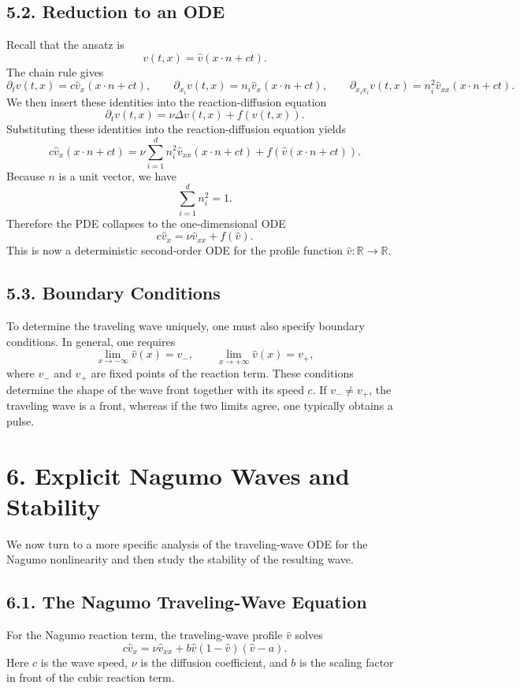 \documentclass[11pt]{article}
\theoremstyle{definition}
\theoremstyle{remark}
\begin{document}
\subsection*{5.2. Reduction to an ODE}
Recall that the ansatz is
\[
v(t,x)=\hat v(x\cdot n+ct).
\]
The chain rule gives
\[
\partial_t v(t,x)=c\hat v_x(x\cdot n+ct),
\qquad
\partial_{x_i}v(t,x)=n_i\hat v_x(x\cdot n+ct),
\qquad
\partial_{x_ix_i}v(t,x)=n_i^2\hat v_{xx}(x\cdot n+ct).
\]
We then insert these identities into the reaction-diffusion equation
\[
\partial_t v(t,x)=\nu \Delta v(t,x)+f(v(t,x)).
\]
Substituting these identities into the reaction-diffusion equation yields
\[
c\hat v_x(x\cdot n+ct)
=
\nu\sum_{i=1}^d n_i^2 \hat v_{xx}(x\cdot n+ct)+f(\hat v(x\cdot n+ct)).
\]
Because $n$ is a unit vector, we have
\[
\sum_{i=1}^d n_i^2=1.
\]
Therefore the PDE collapses to the one-dimensional ODE
\[
c\hat v_x=\nu\hat v_{xx}+f(\hat v).
\]
This is now a deterministic second-order ODE for the profile function $\hat v:\mathbb R\to\mathbb R$.

\subsection*{5.3. Boundary Conditions}
To determine the traveling wave uniquely, one must also specify boundary conditions. In general, one requires
\[
\lim_{x\to-\infty}\hat v(x)=v_-,
\qquad
\lim_{x\to+\infty}\hat v(x)=v_+,
\]
where $v_-$ and $v_+$ are fixed points of the reaction term. These conditions determine the shape of the wave front together with its speed $c$. If $v_-\neq v_+$, the traveling wave is a front, whereas if the two limits agree, one typically obtains a pulse.

\section*{6. Explicit Nagumo Waves and Stability}
We now turn to a more specific analysis of the traveling-wave ODE for the Nagumo nonlinearity and then study the stability of the resulting wave.

\subsection*{6.1. The Nagumo Traveling-Wave Equation}
For the Nagumo reaction term, the traveling-wave profile $\hat v$ solves
\[
c\hat v_x=\nu\hat v_{xx}+b\hat v(1-\hat v)(\hat v-a).
\]
Here $c$ is the wave speed, $\nu$ is the diffusion coefficient, and $b$ is the scaling factor in front of the cubic reaction term.
\end{document}
